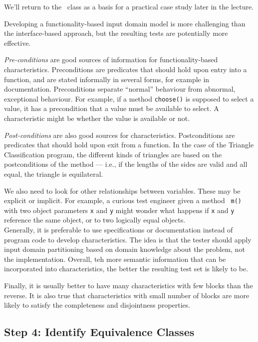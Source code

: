 We'll return to the \triangleclass~class as a basis for a practical case study
later in the lecture. 

Developing a functionality-based input domain model is more challenging than the
interface-based approach, but the resulting tests are potentially more effective.

{\it Pre-conditions} are good sources of information for functionality-based
characteristics. Preconditions are predicates that should hold upon entry into a
function, and are stated informally in several forms, for example in documentation.
Preconditions separate ``normal'' behaviour from abnormal, exceptional
behaviour. For example, if a method {\tt choose()} is supposed to select a
value, it has a precondition that a value must be available to select. A
characteristic might be whether the value is available or not.

{\it Post-conditions} are also good sources for characteristics. Postconditions
are predicates that should hold upon exit from a function. In the case of the
Triangle Classification program, the different kinds of triangles are based on
the postconditions of the method --- i.e., if the lengths of the sides are valid
and all equal, the triangle is equilateral. 

We also need to look for other relationships between variables. These may be
explicit or implicit. For example, a curious test engineer given a method {\tt
m()} with two object parameters {\tt x} and {\tt y} might wonder what happens if
{\tt x} and {\tt y} reference the same object, or to two logically equal
objects.
~\\

Generally, it is preferable to use specifications or documentation instead of
program code to develop characteristics. The idea is that the tester should
apply input domain partitioning based on domain knowledge about the problem, not
the implementation. Overall, teh more semantic information that can be
incorporated into characteristics, the better the resulting test set is likely
to be.

Finally, it is usually better to have many characteristics with few blocks than
the reverse. It is also true that characteristics with small number of blocks
are more likely to satisfy the completeness and disjointness properties. 

\subsection*{Step 4: Identify Equivalence Classes}

